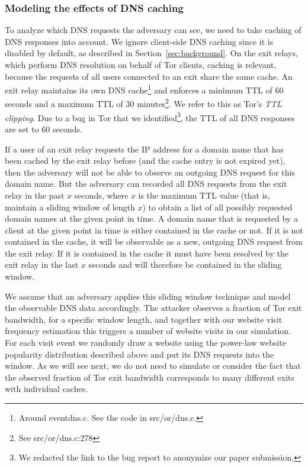 \subsubsection{Modeling the effects of DNS caching}
To analyze which DNS requests the adversary can see, we need to
take caching of DNS responses into account. We ignore client-side DNS
caching since it is disabled by default, as described in
Section~\ref{sec:background}.
On the exit relays, which perform DNS resolution on behalf of Tor clients, caching
is relevant, because the requests of all users connected to an exit
share the same cache. An exit
relay maintains its own DNS cache\footnote{Around eventdns.c.  See the
		code in src/or/dns.c.} and enforces a minimum TTL of 60 seconds
and a maximum TTL of 30 minutes\footnote{See src/or/dns.c:278}.  We
refer to this as Tor's \emph{TTL clipping}. Due to a
bug in Tor that we identified\footnote{We redacted the link to the bug report to anonymize our paper
submission.},
the TTL of all DNS responses are set to 60 seconds.

If a user of an exit relay requests the IP address for a domain name
that has been cached by the exit relay before (and the cache entry is
not expired yet), then the adversary will not be able to observe an
outgoing DNS request for this domain name. But the adversary can
recorded all DNS requests from the exit relay in the past $x$ seconds,
where $x$ is the maximum TTL value (that is, maintain a sliding window of
length $x$) to obtain a list of all possibly requested domain names at the
given point in time. A domain name that is requested by a client at the
given point in time is either contained in the cache or not. If it is
not contained in the cache, it will be observable as a new, outgoing DNS
request from the exit relay. If it is contained in the cache it must
have been resolved by the exit relay in the last $x$ seconds and will
therefore be contained in the sliding window.

We assume that an adversary applies this sliding window technique and
model the observable DNS data accordingly.
The attacker observes a fraction of Tor exit bandwidth,
for a specific window length,
and together with our website visit frequency estimation
this triggers a number of website visits in our simulation.
For each visit event we randomly draw a website using the
power-law website popularity distribution described above and put its
DNS requests into the window. As we will see next, we do not need to
simulate or consider the fact that the observed fraction of Tor exit bandwidth
corresponds to many different exits with individual caches.

